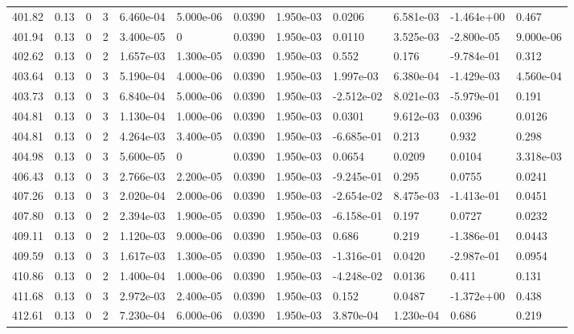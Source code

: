 \documentclass[preview]{standalone}
\begin{document}
{{{{{{{{{{{{{\begin{tabular}{L{1.2cm}C{1.2cm} C{0.3cm}C{0.5cm} C{1.4cm}C{1.4cm} C{1.4cm}C{1.4cm} C{1.6cm}C{1.6cm} C{1.6cm}C{1.6cm}}
  401.82  &  0.13  & 0     &  3 &  6.460e-04  & 5.000e-06  &  0.0390&   1.950e-03& 0.0206 & 6.581e-03   &  -1.464e+00 & 0.467  \\ 
  401.94  &  0.13  & 0     &  2 &  3.400e-05  & 0  &  0.0390&   1.950e-03& 0.0110 & 3.525e-03   &  -2.800e-05 & 9.000e-06  \\ 
  402.62  &  0.13  & 0     &  2 &  1.657e-03  & 1.300e-05  &  0.0390&   1.950e-03& 0.552 & 0.176   &  -9.784e-01 & 0.312  \\ 
  403.64  &  0.13  & 0     &  3 &  5.190e-04  & 4.000e-06  &  0.0390&   1.950e-03& 1.997e-03 & 6.380e-04   &  -1.429e-03 & 4.560e-04  \\ 
  403.73  &  0.13  & 0     &  3 &  6.840e-04  & 5.000e-06  &  0.0390&   1.950e-03& -2.512e-02 & 8.021e-03   &  -5.979e-01 & 0.191  \\ 
  404.81  &  0.13  & 0     &  3 &  1.130e-04  & 1.000e-06  &  0.0390&   1.950e-03& 0.0301 & 9.612e-03   &  0.0396 & 0.0126  \\ 
  404.81  &  0.13  & 0     &  2 &  4.264e-03  & 3.400e-05  &  0.0390&   1.950e-03& -6.685e-01 & 0.213   &  0.932 & 0.298  \\ 
  404.98  &  0.13  & 0     &  3 &  5.600e-05  & 0  &  0.0390&   1.950e-03& 0.0654 & 0.0209   &  0.0104 & 3.318e-03  \\ 
  406.43  &  0.13  & 0     &  3 &  2.766e-03  & 2.200e-05  &  0.0390&   1.950e-03& -9.245e-01 & 0.295   &  0.0755 & 0.0241  \\ 
  407.26  &  0.13  & 0     &  3 &  2.020e-04  & 2.000e-06  &  0.0390&   1.950e-03& -2.654e-02 & 8.475e-03   &  -1.413e-01 & 0.0451  \\ 
  407.80  &  0.13  & 0     &  2 &  2.394e-03  & 1.900e-05  &  0.0390&   1.950e-03& -6.158e-01 & 0.197   &  0.0727 & 0.0232  \\ 
  409.11  &  0.13  & 0     &  2 &  1.120e-03  & 9.000e-06  &  0.0390&   1.950e-03& 0.686 & 0.219   &  -1.386e-01 & 0.0443  \\ 
  409.59  &  0.13  & 0     &  3 &  1.617e-03  & 1.300e-05  &  0.0390&   1.950e-03& -1.316e-01 & 0.0420   &  -2.987e-01 & 0.0954  \\ 
  410.86  &  0.13  & 0     &  2 &  1.400e-04  & 1.000e-06  &  0.0390&   1.950e-03& -4.248e-02 & 0.0136   &  0.411 & 0.131  \\ 
  411.68  &  0.13  & 0     &  3 &  2.972e-03  & 2.400e-05  &  0.0390&   1.950e-03& 0.152 & 0.0487   &  -1.372e+00 & 0.438  \\ 
  412.61  &  0.13  & 0     &  2 &  7.230e-04  & 6.000e-06  &  0.0390&   1.950e-03& 3.870e-04 & 1.230e-04   &  0.686 & 0.219  \\ 

\end{tabular}}}}}}}}}}}}}}
\end{document}
